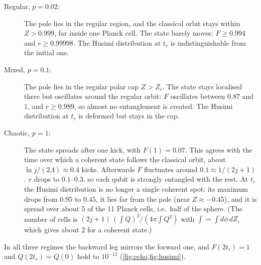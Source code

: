 \documentclass[11pt,a4paper]{article}
\begin{document}
\begin{description}
\item[Regular, $p=0.02$:] The pole lies in the regular region, and the classical orbit stays within $Z>0.999$, far
  inside one Planck cell. The state barely moves: $F\ge0.994$ and $r\ge0.99998$. The Husimi distribution at $t_r$ is
  indistinguishable from the initial one.
\item[Mixed, $p=0.1$:] The pole lies in the regular polar cap $Z>Z_c$. The state stays localised there but oscillates
  around the regular orbit: $F$ oscillates between $0.87$ and $1$, and $r\ge0.989$, so almost no entanglement is
  created. The Husimi distribution at $t_r$ is deformed but stays in the cap.
\item[Chaotic, $p=1$:] The state spreads after one kick, with $F(1)=0.07$. This agrees with the time over which a
  coherent state follows the classical orbit, about $\ln j/(2\Lambda)\approx0.4$ kicks. Afterwards $F$ fluctuates
  around $0.1\approx1/(2j+1)$. $r$ drops to $0.1$–$0.3$, so each qubit is strongly entangled with the rest. At $t_r$
  the Husimi distribution is no longer a single coherent spot: its maximum drops from $0.95$ to $0.45$, it lies far
  from the pole (near $Z\approx-0.45$), and it is spread over about 5 of the 11 Planck cells, i.e.\ half of the
  sphere. (The number of cells is $(2j+1)\,(\int Q)^2/(4\pi\int Q^2)$ with $\int=\int d\phi\,dZ$, which gives
  about 2 for a coherent state.)
\end{description}
In all three regimes the backward leg mirrors the forward one, and $F(2t_r)=1$ and $Q(2t_r)=Q(0)$ hold to
$10^{-13}$ (\cref{fig:echo,fig:husimi}).
\end{document}
